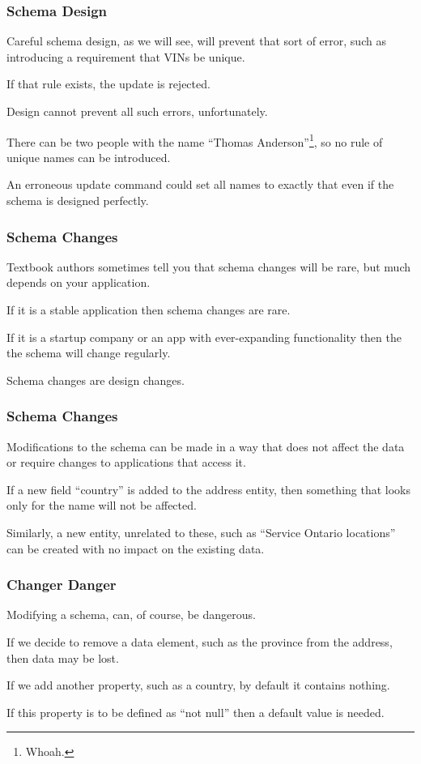 \begin{frame}
\frametitle{Schema Design}

Careful schema design, as we will see, will prevent that sort of error, such as introducing a requirement that VINs be unique. 

If that rule exists, the update is rejected. 

Design cannot prevent all such errors, unfortunately. 

There can be two people with the name ``Thomas Anderson''\footnote{Whoah.}, so no rule of unique names can be introduced.

An erroneous update command could set all names to exactly that even if the schema is designed perfectly.


\end{frame}




\begin{frame}
\frametitle{Schema Changes}

Textbook authors sometimes tell you that schema changes will be rare, but much depends on your application. 

If it is a stable application then schema changes are rare. 

If it is a startup company or an app with ever-expanding functionality then the the schema will change regularly. 

Schema changes are design changes.

\end{frame}



\begin{frame}
\frametitle{Schema Changes}

Modifications to the schema can be made in a way that does not affect the data or require changes to applications that access it. 

If a new field ``country'' is added to the address entity, then something that looks only for the name will not be affected. 

Similarly, a new entity, unrelated to these, such as ``Service Ontario locations'' can be created with no impact on the existing data.

\end{frame}



\begin{frame}
\frametitle{Changer Danger}

Modifying a schema, can, of course, be dangerous. 

If we decide to remove a data element, such as the province from the address, then data may be lost. 

If we add another property, such as a country, by default it contains nothing. 

If this property is to be defined as ``not null'' then a default value is needed.


\end{frame}



